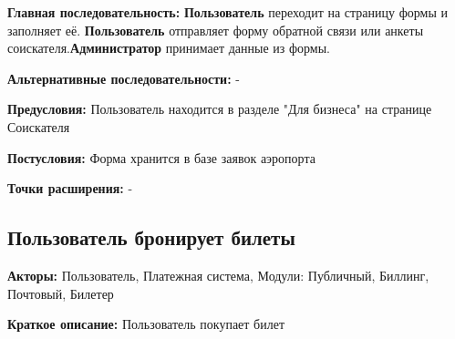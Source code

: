 \textbf{Главная последовательность:} \textbf{Пользователь} переходит на страницу формы и заполняет её.
\textbf{Пользователь} отправляет форму обратной связи или
анкеты соискателя.\textbf{Администратор} принимает данные из формы.

\textbf{Альтернативные последовательности:} -

\textbf{Предусловия:} Пользователь находится в разделе "Для бизнеса" на странице Соискателя

\textbf{Постусловия:} Форма хранится в базе заявок аэропорта

\textbf{Точки расширения:} -




\subsection{Пользователь бронирует билеты}

\textbf{Акторы:} Пользователь, Платежная система, Модули: Публичный, Биллинг, Почтовый, Билетер

\textbf{Краткое описание:} Пользователь покупает билет

